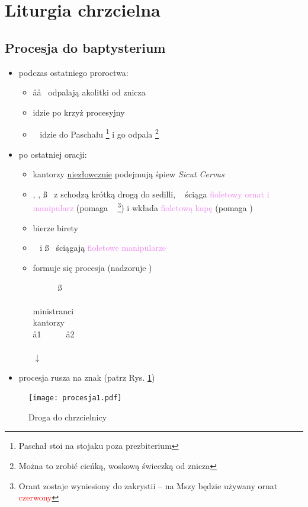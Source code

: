 \section{Liturgia chrzcielna}

\subsection{Procesja do baptysterium}

\begin{itemize}
	\item podczas ostatniego proroctwa:
	      \begin{itemize}
		      \item \aa\aa~ odpalają akolitki od znicza
		      \item {} idzie po krzyż procesyjny
		      \item \paschal~ idzie do Paschału \footnote{Paschał stoi na
			            stojaku poza prezbiterium} i go odpala \footnote{Można
			            to zrobić cieńką, woskową świeczką od znicza}
	      \end{itemize}
	\item po ostatniej oracji:
	      \begin{itemize}
		      \item kantorzy \underline{niezłowcznie}
		            podejmują śpiew \textit{Sicut Cervus}
		      \item \ii, \dd, \ss~ z  schodzą krótką drogą do sedilli,
		            \ii~ ściąga \textcolor{violet}{fioletowy ornat i manipularz}
		            (pomaga \zz~ \footnote{Orant zostaje wyniesiony do zakrystii
			            -- na Mszy będzie używany ornat \textcolor{red}{czerwony}})
		            i wkłada \textcolor{violet}{fioletową kapę} (pomaga )
		      \item {} bierze birety
		      \item \dd~ i \ss~ ściągają \textcolor{violet}{fioletowe manipularze}
		      \item formuje się procesja (nadzoruje )
		            \begin{center}
			            \dd~~~\ii~~~\ss \smallskip\\
			             \\
			            ministranci \smallskip\\
			            kantorzy \smallskip\\
			            \aa1~~~~~~\aa2 \smallskip\\
			            ~~\paschal~~~~~~~ \smallskip\\
			            $\downarrow$
		            \end{center}
	      \end{itemize}
	\item procesja rusza na znak  (patrz Rys. \ref{fig:procesja1})
\end{itemize}
%
\begin{figure}[h]
	\centering
	\texttt{[image: procesja1.pdf]}
	\caption{Droga do chrzcielnicy}
	\label{fig:procesja1}
\end{figure}
%
